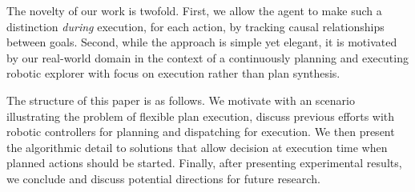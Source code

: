 The novelty of our work is twofold. First, we allow the agent to make
such a distinction \emph{during} execution, for each action, by
tracking causal relationships between goals. Second, while the
approach is simple yet elegant, it is motivated by our real-world
domain in the context of a continuously planning and executing robotic
explorer with focus on execution rather than plan synthesis.


The structure of this paper is as follows. We motivate with an
scenario illustrating the problem of flexible plan execution, discuss
previous efforts with robotic controllers for planning and dispatching
for execution. We then present the algorithmic detail to solutions
that allow decision at execution time when planned actions should be
started. Finally, after presenting experimental results, we conclude
and discuss potential directions for future research.

